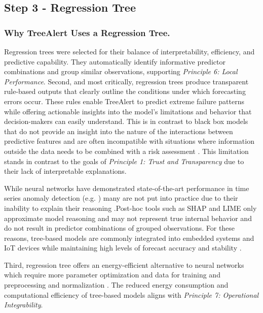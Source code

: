 \documentclass[preprint,12pt]{elsarticle}
\begin{document}
\subsection{Step 3 - Regression Tree}

\subsubsection{Why TreeAlert Uses a Regression Tree.}

Regression trees were selected for their balance of interpretability, efficiency, and predictive capability. They automatically identify informative predictor combinations and group similar observations, supporting \emph{Principle 6: Local Performance}. Second, and most critically, regression trees produce transparent rule-based outputs that clearly outline the conditions under which forecasting errors occur. These rules enable TreeAlert to predict extreme failure patterns while offering actionable insights into the model's limitations and behavior that decision-makers can easily understand. This is in contrast to black box models that do not provide an insight into the nature of the interactions between predictive features \citep{lai2009} and are often incompatible with situations where information outside the data needs to be combined with a risk assessment \citep{rudin2019}. This limitation stands in contrast to the goals of \textit{Principle 1: Trust and Transparency} due to their lack of interpretable explanations.

While neural networks have demonstrated state-of-the-art performance in time series anomaly detection (e.g. \cite{wang2024a}) many are not put into practice due to their inability to explain their reasoning \citep{houssainy2021}.Post-hoc tools such as SHAP and LIME only approximate model reasoning and may not represent true internal behavior \citep{rudin2019} and do not result in predictor combinations of grouped observations. For these reasons, tree-based models are commonly integrated into embedded systems and IoT devices \citep{silva2022} while maintaining high levels of forecast accuracy and stability \citep{houssainy2021}.

Third, regression tree offers an energy-efficient alternative to neural networks which require more parameter optimization and data for training and preprocessing and normalization \citep{reina2023, silva2022, spiliotis2022}. The reduced energy consumption and computational efficiency of tree-based models aligns with \textit{Principle 7: Operational Integrability}.
\end{document}
